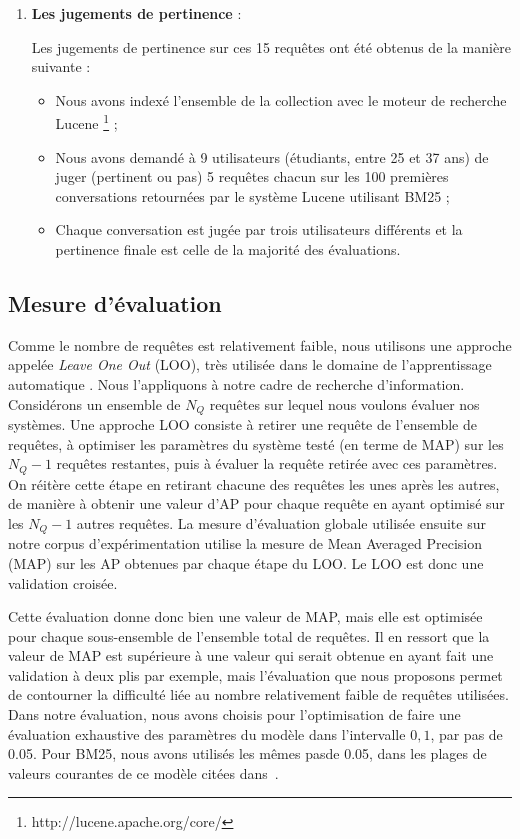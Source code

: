 \documentclass{article-hermes}
\begin{document}
\begin{enumerate}
\vspace{0.5cm}
\item \textbf{Les jugements de pertinence} : 

\par Les jugements de pertinence sur ces 15 requêtes ont été obtenus de la manière suivante : 
\begin{itemize}
\item Nous avons indexé l'ensemble de la collection avec le moteur de recherche Lucene \footnote{http://lucene.apache.org/core/} ;
\item Nous avons demandé à 9 utilisateurs (étudiants, entre 25 et 37 ans) de juger (pertinent ou pas) 5 requêtes chacun sur les 100 premières conversations retournées par le système Lucene utilisant BM25 ;
\item Chaque conversation est jugée par trois utilisateurs différents et la pertinence finale est celle de la majorité des évaluations.
\end{itemize}
\end{enumerate}


\subsection{Mesure d'évaluation}
\par Comme le nombre de requêtes est relativement faible, nous utilisons une approche appelée {\it Leave One Out} (LOO), très utilisée dans le domaine de l'apprentissage automatique \cite{arlot2010}. Nous l'appliquons à notre cadre de recherche d'information. Considérons un ensemble de $N_Q$ requêtes sur lequel nous voulons évaluer nos systèmes. Une approche LOO consiste à retirer une requête de l'ensemble de requêtes, à optimiser les paramètres du système testé (en terme de MAP) sur les $N_Q-1$ requêtes restantes, puis à évaluer la requête retirée avec ces paramètres. On réitère cette étape en retirant chacune des requêtes les unes après les autres, de manière à obtenir une valeur d'AP pour chaque requête en ayant optimisé sur les $N_Q-1$ autres requêtes. La mesure d'évaluation globale utilisée ensuite sur notre corpus d'expérimentation utilise la mesure de Mean Averaged Precision (MAP) sur les AP obtenues par chaque étape du LOO. Le LOO est donc une validation croisée.

\par Cette évaluation donne donc bien une valeur de MAP, mais elle est optimisée pour chaque sous-ensemble de l'ensemble total de requêtes. Il en ressort que la valeur de MAP est supérieure à une valeur qui serait obtenue en ayant fait une validation à deux plis par exemple, mais l'évaluation que nous proposons permet de contourner la difficulté liée au nombre relativement faible de requêtes utilisées. Dans notre évaluation, nous avons choisis pour l'optimisation de faire une évaluation exhaustive des paramètres du modèle dans l'intervalle $0,1$, par pas de 0.05. Pour BM25, nous avons utilisés les mêmes pasde 0.05,  dans les plages de valeurs courantes de ce modèle citées dans~\cite{Singhal01moderninformation}.
\end{document}
